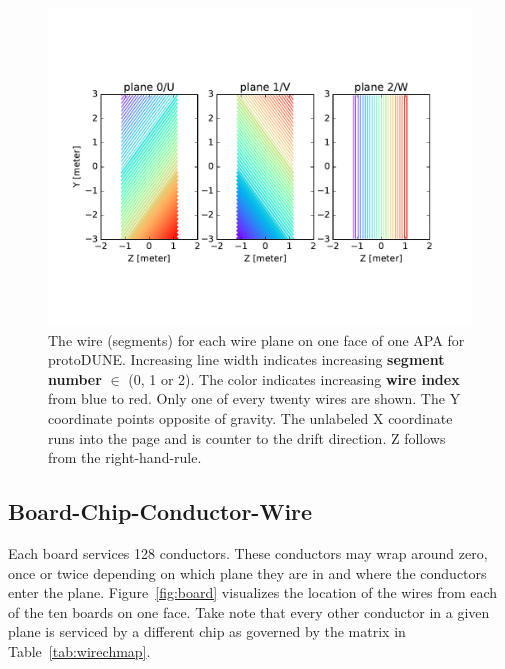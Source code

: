 \documentclass[pdftex,12pt,letter]{article}
\begin{document}
\begin{figure}[htp]
  \centering
  \includegraphics[width=\textwidth,clip,trim=0 3cm 0 3cm]{wires-20.pdf}
  \caption{The wire (segments) for each wire plane on one face of one APA for protoDUNE.  Increasing line width indicates increasing \textbf{segment number} $\in$ (0, 1 or 2).  The color indicates increasing \textbf{wire index} from blue to red.  Only one of every twenty wires are shown. The Y coordinate points opposite of gravity.  The unlabeled X coordinate runs into the page and is counter to the drift direction.  Z follows from the right-hand-rule.}
  \label{fig:wires}
\end{figure}


\subsection{Board-Chip-Conductor-Wire}

Each board services 128 conductors.  These conductors may wrap around
zero, once or twice depending on which plane they are in and where the
conductors enter the plane.  Figure~\ref{fig:board} visualizes the
location of the wires from each of the ten boards on one face.  Take
note that every other conductor in a given plane is serviced by a
different chip as governed by the matrix in Table~\ref{tab:wirechmap}.
\end{document}
